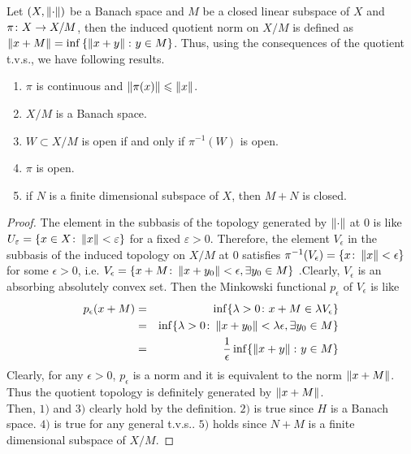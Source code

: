 \documentclass[a4paper,11pt]{report}
\begin{document}
\begin{thm}
	Let $(X, \left\lVert\cdot\right\lVert)$ be a Banach space and $M$ be a closed linear subspace of $X$ and $\pi \colon X \rightarrow X/M$, then the induced quotient norm on $X/M$ is defined as $\left\lVert x+M\right\lVert = \operatorname{inf}{\{\left\lVert x+y\right\lVert \colon y \in M\}}$. Thus, using the consequences of the quotient t.v.s., we have following results.
	\begin{enumerate}[label=\arabic*)]
		\item $\pi$ is continuous and $\left\lVert\pi(x)\right\lVert \leqslant \left\lVert x\right\lVert$.
		\item $X/M$ is a Banach space.
		\item $W \subset X/M$ is open if and only if $\pi^{-1}(W)$ is open.
		\item $\pi$ is open.
		\item if $N$ is a finite dimensional subspace of $X$, then $M+N$ is closed.
	\end{enumerate}
\end{thm}
\begin{proof}
	The element in the subbasis of the topology generated by $\left\lVert\cdot\right\lVert$ at $0$ is like $U_\varepsilon=\{x \in X \colon \left\lVert x\right\lVert < \varepsilon\}$ for a fixed $\varepsilon > 0$. Therefore, the element $V_\epsilon$ in the subbasis of the induced topology on $X/M$ at $0$ satisfies $\pi^{-1}(V_\epsilon)=\{x \colon \left\lVert x\right\lVert < \epsilon\}$ for some $\epsilon > 0$, i.e. $V_\epsilon = \{x+M \colon \left\lVert x+y_0\right\lVert < \epsilon, \exists y_0 \in M\}$ .Clearly, $V_\epsilon$ is an absorbing absolutely convex set. Then the Minkowski functional $p_\epsilon$ of $V_\epsilon$ is like
	\begin{eqnarray*}
		p_\epsilon(x+M) &=& \operatorname{inf} \{\lambda > 0 \colon x+M \in \lambda V_\epsilon\} \\
					 &=& \operatorname{inf} \{\lambda > 0 \colon \left\lVert x+y_0\right\lVert < \lambda \epsilon,\exists y_0 \in M \} \\
					 &=& \frac{1}{\epsilon} \operatorname{inf} \{{\left\lVert x+y\right\lVert \colon y \in M}\}
	\end{eqnarray*}
	Clearly, for any $\epsilon > 0$, $p_\epsilon$ is a norm and it is equivalent to the norm $\left\lVert x+M\right\lVert$. Thus the quotient topology is definitely generated by $\left\lVert x+M\right\lVert$.\\
	Then, $1)$ and $3)$ clearly hold by the definition. $2)$ is true since $H$ is a Banach space. $4)$ is true for any general t.v.s.. $5)$ holds since $N+M$ is a finite dimensional subspace of $X/M$. 
\end{proof}
\end{document}
